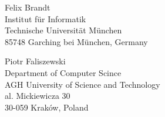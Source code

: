 \documentclass{comsoc2012}
\begin{document}


\begin{contact}
Felix Brandt\\
Institut f\"ur Informatik\\
Technische Universit\"at M\"unchen\\
85748 Garching bei M\"unchen, Germany\\
\end{contact}

\begin{contact}
Piotr Faliszewski\\
Department of Computer Scince\\
AGH University of Science and Technology\\
al. Mickiewicza 30\\
30-059 Krak\'ow, Poland\\
\end{contact}

\end{document}
